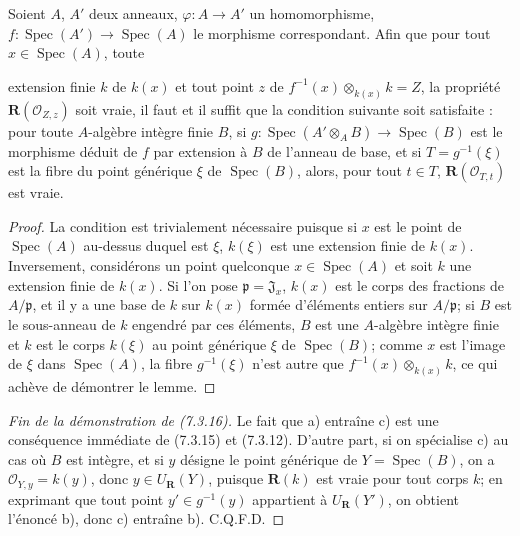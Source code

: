 \begin{lemma}[7.3.16.2]
\label{IV.2.s7.3.16.2-fr}
Soient $A$, $A'$ deux anneaux, $\varphi:A\to A'$ un homomorphisme,
$f:\operatorname{Spec}(A')\to\operatorname{Spec}(A)$ le morphisme
correspondant. Afin que pour tout $x\in\operatorname{Spec}(A)$, toute


extension finie $k$ de $k(x)$ et tout point $z$ de
$f^{-1}(x)\otimes_{k(x)}k=Z$, la propriété
$\boldsymbol R(\mathscr O_{Z,z})$ soit vraie, il faut et il suffit que la
condition suivante soit satisfaite : pour toute $A$-algèbre intègre finie
$B$, si
$g:\operatorname{Spec}(A'\otimes_A B)\to\operatorname{Spec}(B)$ est le
morphisme déduit de $f$ par extension à $B$ de l'anneau de base, et si
$T=g^{-1}(\xi)$ est la fibre du point générique $\xi$ de
$\operatorname{Spec}(B)$, alors, pour tout $t\in T$,
$\boldsymbol R(\mathscr O_{T,t})$ est vraie.
\end{lemma}

\begin{proof}
La condition est trivialement nécessaire puisque si $x$ est le point de
$\operatorname{Spec}(A)$ au-dessus duquel est $\xi$, $k(\xi)$ est une
extension finie de $k(x)$. Inversement, considérons un point quelconque
$x\in\operatorname{Spec}(A)$ et soit $k$ une extension finie de $k(x)$.
Si l'on pose $\mathfrak p=\mathfrak J_x$, $k(x)$ est le corps des
fractions de $A/\mathfrak p$, et il y a une base de $k$ sur $k(x)$ formée
d'éléments entiers sur $A/\mathfrak p$; si $B$ est le sous-anneau de $k$
engendré par ces éléments, $B$ est une $A$-algèbre intègre finie et $k$
est le corps $k(\xi)$ au point générique $\xi$ de
$\operatorname{Spec}(B)$; comme $x$ est l'image de $\xi$ dans
$\operatorname{Spec}(A)$, la fibre $g^{-1}(\xi)$ n'est autre que
$f^{-1}(x)\otimes_{k(x)}k$, ce qui achève de démontrer le lemme.
\end{proof}

\begin{proof}[Fin de la démonstration de (7.3.16)]
Le fait que a) entraîne c) est une conséquence immédiate de (7.3.15) et
(7.3.12). D'autre part, si on spécialise c) au cas où $B$ est intègre, et
si $y$ désigne le point générique de $Y=\operatorname{Spec}(B)$, on a
$\mathscr O_{Y,y}=k(y)$, donc $y\in U_{\boldsymbol R}(Y)$, puisque
$\boldsymbol R(k)$ est vraie pour tout corps $k$; en exprimant que tout
point $y'\in g^{-1}(y)$ appartient à $U_{\boldsymbol R}(Y')$, on obtient
l'énoncé b), donc c) entraîne b). C.Q.F.D.
\end{proof}


